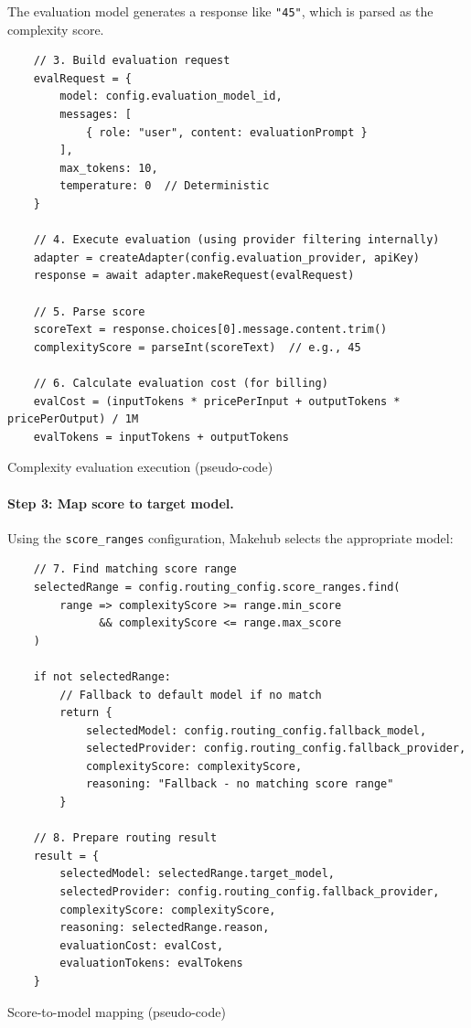 \documentclass[english]{article}
\begin{document}
The evaluation model generates a response like \texttt{"45"}, which is parsed as the complexity score.

\begin{listing}[H]
\begin{verbatim}
    // 3. Build evaluation request
    evalRequest = {
        model: config.evaluation_model_id,
        messages: [
            { role: "user", content: evaluationPrompt }
        ],
        max_tokens: 10,
        temperature: 0  // Deterministic
    }

    // 4. Execute evaluation (using provider filtering internally)
    adapter = createAdapter(config.evaluation_provider, apiKey)
    response = await adapter.makeRequest(evalRequest)

    // 5. Parse score
    scoreText = response.choices[0].message.content.trim()
    complexityScore = parseInt(scoreText)  // e.g., 45

    // 6. Calculate evaluation cost (for billing)
    evalCost = (inputTokens * pricePerInput + outputTokens * pricePerOutput) / 1M
    evalTokens = inputTokens + outputTokens
\end{verbatim}
\caption{Complexity evaluation execution (pseudo-code)}
\end{listing}

\paragraph{Step 3: Map score to target model.}

Using the \texttt{score\_ranges} configuration, Makehub selects the appropriate model:

\begin{listing}[H]
\begin{verbatim}
    // 7. Find matching score range
    selectedRange = config.routing_config.score_ranges.find(
        range => complexityScore >= range.min_score
              && complexityScore <= range.max_score
    )

    if not selectedRange:
        // Fallback to default model if no match
        return {
            selectedModel: config.routing_config.fallback_model,
            selectedProvider: config.routing_config.fallback_provider,
            complexityScore: complexityScore,
            reasoning: "Fallback - no matching score range"
        }

    // 8. Prepare routing result
    result = {
        selectedModel: selectedRange.target_model,
        selectedProvider: config.routing_config.fallback_provider,
        complexityScore: complexityScore,
        reasoning: selectedRange.reason,
        evaluationCost: evalCost,
        evaluationTokens: evalTokens
    }
\end{verbatim}
\caption{Score-to-model mapping (pseudo-code)}
\end{listing}
\end{document}
